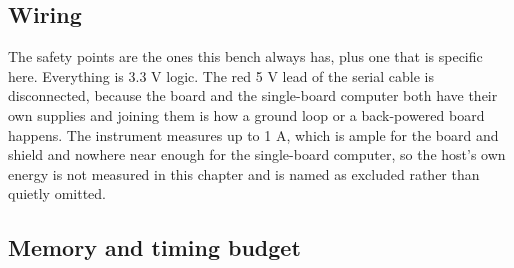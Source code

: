 \subsection*{Wiring}


The safety points are the ones this bench always has, plus one that is specific
here. Everything is 3.3 V logic. The red 5 V lead of the serial cable is
disconnected, because the board and the single-board computer both have their
own supplies and joining them is how a ground loop or a back-powered board
happens. The instrument measures up to 1 A, which is ample for the board and
shield and nowhere near enough for the single-board computer, so the host's own
energy is not measured in this chapter and is named as excluded rather than
quietly omitted.

\subsection*{Memory and timing budget}


